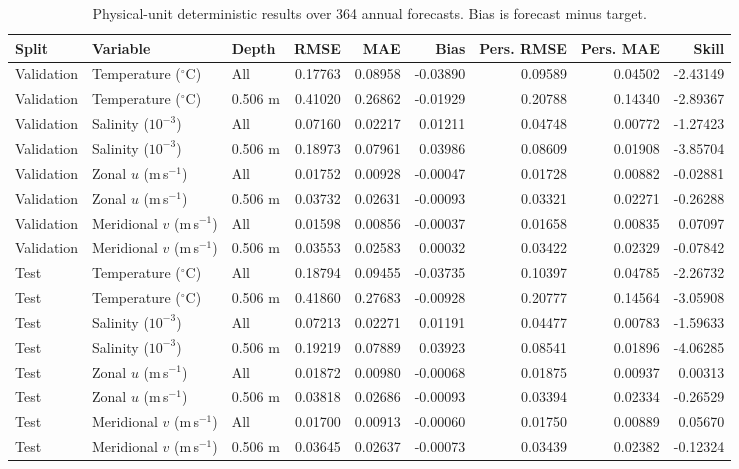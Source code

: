 \begin{table}[p]
\centering\scriptsize
\setlength{\tabcolsep}{4pt}
\caption{Physical-unit deterministic results over 364 annual forecasts. Bias is forecast minus target.}
\label{tab:physical-deterministic-results}
\begin{tabular}{lllrrrrrr}
\toprule
Split & Variable & Depth & RMSE & MAE & Bias & Pers. RMSE & Pers. MAE & Skill \\
\midrule
Validation & Temperature ($^\circ$C) & All & 0.17763 & 0.08958 & -0.03890 & 0.09589 & 0.04502 & -2.43149 \\
Validation & Temperature ($^\circ$C) & 0.506 m & 0.41020 & 0.26862 & -0.01929 & 0.20788 & 0.14340 & -2.89367 \\
Validation & Salinity ($10^{-3}$) & All & 0.07160 & 0.02217 & 0.01211 & 0.04748 & 0.00772 & -1.27423 \\
Validation & Salinity ($10^{-3}$) & 0.506 m & 0.18973 & 0.07961 & 0.03986 & 0.08609 & 0.01908 & -3.85704 \\
Validation & Zonal $u$ (m\,s$^{-1}$) & All & 0.01752 & 0.00928 & -0.00047 & 0.01728 & 0.00882 & -0.02881 \\
Validation & Zonal $u$ (m\,s$^{-1}$) & 0.506 m & 0.03732 & 0.02631 & -0.00093 & 0.03321 & 0.02271 & -0.26288 \\
Validation & Meridional $v$ (m\,s$^{-1}$) & All & 0.01598 & 0.00856 & -0.00037 & 0.01658 & 0.00835 & 0.07097 \\
Validation & Meridional $v$ (m\,s$^{-1}$) & 0.506 m & 0.03553 & 0.02583 & 0.00032 & 0.03422 & 0.02329 & -0.07842 \\
Test & Temperature ($^\circ$C) & All & 0.18794 & 0.09455 & -0.03735 & 0.10397 & 0.04785 & -2.26732 \\
Test & Temperature ($^\circ$C) & 0.506 m & 0.41860 & 0.27683 & -0.00928 & 0.20777 & 0.14564 & -3.05908 \\
Test & Salinity ($10^{-3}$) & All & 0.07213 & 0.02271 & 0.01191 & 0.04477 & 0.00783 & -1.59633 \\
Test & Salinity ($10^{-3}$) & 0.506 m & 0.19219 & 0.07889 & 0.03923 & 0.08541 & 0.01896 & -4.06285 \\
Test & Zonal $u$ (m\,s$^{-1}$) & All & 0.01872 & 0.00980 & -0.00068 & 0.01875 & 0.00937 & 0.00313 \\
Test & Zonal $u$ (m\,s$^{-1}$) & 0.506 m & 0.03818 & 0.02686 & -0.00093 & 0.03394 & 0.02334 & -0.26529 \\
Test & Meridional $v$ (m\,s$^{-1}$) & All & 0.01700 & 0.00913 & -0.00060 & 0.01750 & 0.00889 & 0.05670 \\
Test & Meridional $v$ (m\,s$^{-1}$) & 0.506 m & 0.03645 & 0.02637 & -0.00073 & 0.03439 & 0.02382 & -0.12324 \\
\bottomrule
\end{tabular}
\end{table}

